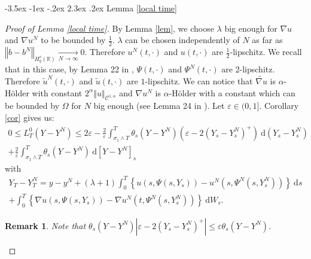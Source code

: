 \documentclass[11pt]{enstaPRE}
\makeatletter
\renewcommand\section{\@startsection {section}{1}{\z@}%
    {-3.5ex \@plus -1ex \@minus -.2ex}%
    {2.3ex \@plus.2ex}%
    {\centering\large\scshape\bfseries}}
\newtheorem{rem}{Remark}
\newcommand{\norme}[1]{\left\Vert #1\right\Vert}
\newcommand{\R}{\mathbb{R}}
\newcommand{\di}{\mathrm{d}}
\makeatother
\begin{document}
\section{Lemma \ref{local time}}

\begin{proof}[Proof of Lemma \ref{local time}]
    By Lemma \ref{lem}, we choose $\lambda$ big enough for $\nabla u$ and $\nabla u^N$ to be bounded by $\frac{1}{2}$. $\lambda$ can be chosen independently of $N$ as far as $\norme{b - b^N}_{H_q^s(\R)} \underset{N\rightarrow\infty}{\longrightarrow} 0$. Therefore $u^N(t,\cdot)$ and $u(t,\cdot)$ are $\frac{1}{2}$-lipschitz. We recall that in this case, by Lemma 22 in \cite{Fla-Iss-Rus-2017}, $\Psi(t,\cdot)$ and $\Psi^N(t,\cdot)$ are 2-lipschitz. Therefore $\widetilde{u}^N(t,\cdot)$ and $\widetilde{u}(t,\cdot)$ are $1$-lipschitz. We can notice that $\widetilde{\nabla u}$ is $\alpha$-Hölder with constant $2^\alpha\norme{u}_{\mathcal{C}^{1,\alpha}}$ and $\nabla u^N$ is $\alpha$-Hölder with a constant which can be bounded by $\Omega$ for $N$ big enough (see Lemma 24 in \cite{Fla-Iss-Rus-2017}).
    Let $\varepsilon\in(0,1]$. Corollary \ref{cor} gives us:    
    \begin{multline*}
    0\leq L^0_T(Y-Y^N) \leq 2\varepsilon - \frac{2}{\varepsilon}\int_{\sigma_1\wedge T}^T \theta_s(Y-Y^N) \left(\varepsilon - 2{(Y_s-Y_s^N)^+}\right)\ \di \left(Y_s-Y_s^N\right)\\
    +\frac{2}{\varepsilon}\int_{\sigma_1\wedge T}^T \theta_s(Y-Y^N) \ \di\left[Y-Y^N\right]_s
    \end{multline*}    
    with
    \begin{multline*}    
    Y_T-Y_T^N = y-y^N + (\lambda + 1 )\int_0^T\left\{u\left(s,\Psi\left(s,Y_s\right)\right)-u^N\left(s,\Psi^N\left(s,Y_s^N\right)\right)\right\}\ \di s\\ + \int_0^T\left\{\nabla u\left(s,\Psi\left(s,Y_s\right)\right)-\nabla u^N\left(t,\Psi^N\left(s,Y_s^N\right)\right)\right\}\ \di W_s.
    \end{multline*}    
    \begin{rem}
        Note that $\theta_s(Y-Y^N) \left|\varepsilon - 2{(Y_s-Y_s^N)^+}\right|\leq \varepsilon\theta_s(Y-Y^N)$.
    \end{rem}    
    

\end{proof}
\end{document}
